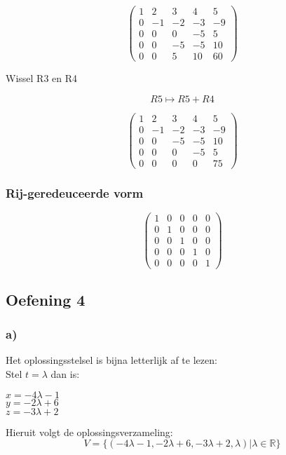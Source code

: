 \documentclass[lineaire_algebra_oplossingen.tex]{subfiles}
\begin{document}
\[
\begin{pmatrix}
1 &  2 &  3 &  4 &  5\\
0 & -1 & -2 & -3 & -9\\
0 &  0 &  0 & -5 &  5\\
0 &  0 & -5 & -5 & 10\\
0 &  0 &  5 & 10 & 60 
\end{pmatrix}
\]
\begin{center}
Wissel R3 en R4
\end{center}
\[ R5 \longmapsto R5 + R4\]

\[
\begin{pmatrix}
1 &  2 &  3 &  4 &  5\\
0 & -1 & -2 & -3 & -9\\
0 &  0 & -5 & -5 & 10\\
0 &  0 &  0 & -5 &  5\\
0 &  0 &  0 &  0 & 75 
\end{pmatrix}
\]

\subsubsection*{Rij-geredeuceerde vorm}
\[
\begin{pmatrix}
1 &  0 &  0 &  0 & 0\\
0 &  1 &  0 &  0 & 0\\
0 &  0 &  1 &  0 & 0\\
0 &  0 &  0 &  1 & 0\\
0 &  0 &  0 &  0 & 1 
\end{pmatrix}
\]

\subsection{Oefening 4}
\subsubsection*{a)}
Het oplossingsstelsel is bijna letterlijk af te lezen:\\
Stel $t=\lambda$ dan is:\\
\begin{center}
$x = -4\lambda - 1$\\
$y = -2\lambda + 6$\\
$z = -3\lambda + 2$\\
\end{center}
Hieruit volgt de oplossingsverzameling:
\[
V=\{(-4\lambda - 1,-2\lambda + 6,-3\lambda + 2, \lambda)|\lambda \in \mathbb{R}\}
\]
\end{document}
